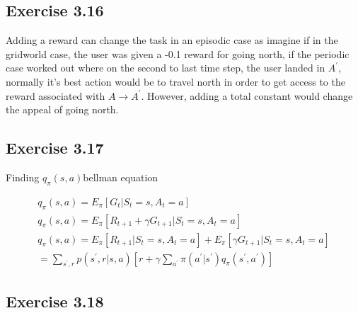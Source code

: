 \subsection{Exercise 3.16}
Adding a reward can change the task in an episodic case as imagine if in the gridworld case, the user was given a -0.1 reward for going north, if the periodic case worked out where on the second to last time step, the user landed in $A^\prime$, normally it's best action would be to travel north in order to get access to the reward associated with $A \rightarrow A^\prime$. However, adding a total constant would change the appeal of going north.

\subsection{Exercise 3.17}
Finding $q_\pi(s,a)$bellman equation

\begin{gather}
  q_\pi(s,a) = E_\pi[G_t | S_t=s, A_t = a] \\
  q_\pi(s,a) = E_\pi[R_{t+1} + \gamma G_{t+1} | S_t=s, A_t = a] \\
  q_\pi(s,a) = E_\pi[R_{t+1} | S_t= s, A_t = a] + E_\pi[\gamma G_{t+1} | S_t=s, A_t = a] \\
  = \sum_{s^\prime,r} p(s^\prime, r | s,a)[r + \gamma \sum_{a^\prime} \pi(a^\prime|s^\prime) q_\pi(s^\prime,a^\prime)]
\end{gather}

\subsection{Exercise 3.18}
